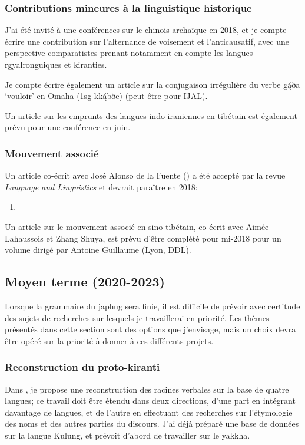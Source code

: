 \documentclass[oldfontcommands,oneside,a4paper,11pt]{article}
\newcommand{\ipa}[1]{{\phon #1}} %
\begin{document}
\subsubsection{Contributions mineures à la linguistique historique}
J'ai été invité à une conférences sur le chinois archaïque en 2018, et je compte écrire une contribution sur l'alternance de voisement et l'anticausatif, avec une perspective comparatistes prenant notamment en compte les langues rgyalronguiques et kiranties.


Je compte écrire également un article sur la conjugaison irrégulière du verbe \ipa{gą́ða}  `vouloir' en Omaha (1sg \ipa{kką́bðe}) (peut-être pour IJAL).

Un article sur les emprunts des langues indo-iraniennes en tibétain est également prévu pour une conférence en juin.

\subsubsection{Mouvement associé}
Un article co-écrit avec José Alonso de la Fuente (\citealt{fuente18am}) a été accepté par la revue \textit{Language and Linguistics} et devrait paraître en 2018:

\begin{enumerate}
  \item  {}
\end{enumerate}

Un article sur le mouvement associé en sino-tibétain, co-écrit avec Aimée Lahaussois et Zhang Shuya, est prévu d'être complété pour mi-2018 pour un volume dirigé par Antoine Guillaume (Lyon, DDL).

\subsection{Moyen terme (2020-2023)}
Lorsque la grammaire du japhug sera finie, il est difficile de prévoir avec certitude des sujets de recherches sur lesquels je travaillerai en priorité. Les thèmes présentés dans cette section sont des options que j'envisage, mais un choix devra être opéré sur la priorité à donner à ces différents projets.

\subsubsection{Reconstruction du proto-kiranti}
Dans \citet{jacques17pkiranti}, je propose une reconstruction des racines verbales sur la base de quatre langues; ce travail doit être étendu dans deux directions, d'une part en intégrant davantage de langues, et de l'autre en effectuant des recherches sur l'étymologie des noms et des autres parties du discours. J'ai déjà préparé une base de données sur la langue Kulung, et prévoit d'abord de travailler sur le yakkha.
\end{document}
